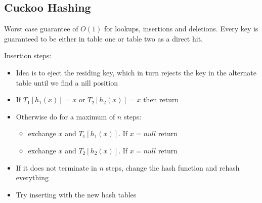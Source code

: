 \subsection{Cuckoo Hashing}
Worst case guarantee of \( O(1) \) for lookups, insertions and deletions. 
Every key is guaranteed to be either in table one or table two as a direct hit.

Insertion steps:
\begin{itemize}
    \item Idea is to eject the residing key, which in turn rejects the key in the alternate table until we find a nill position
    \item If \( T_1 \left[ h_1 \left(x \right) \right] = x \) or \( T_2 \left[ h_2 \left(x \right) \right] = x \) then return
    \item Otherwise do for a maximum of \( n \) steps:
        \begin{itemize}
            \item exchange \( x \) and \( T_1 \left[ h_1 \left(x \right) \right] \). If \( x = null \) return
            \item exchange \( x \) and \( T_2 \left[ h_2 \left(x \right) \right] \). If \( x = null \) return
        \end{itemize}
    \item If it does not terminate in \( n \) steps, change the hash function and rehash everything
    \item Try inserting with the new hash tables
\end{itemize}

